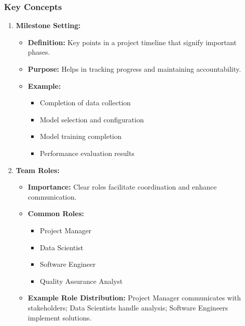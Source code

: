 \documentclass[aspectratio=169]{beamer}
\begin{document}
\begin{frame}[fragile]
    \frametitle{Key Concepts}
    \begin{enumerate}
        \item \textbf{Milestone Setting:}
            \begin{itemize}
                \item \textbf{Definition:} Key points in a project timeline that signify important phases.
                \item \textbf{Purpose:} Helps in tracking progress and maintaining accountability.
                \item \textbf{Example:}
                    \begin{itemize}
                        \item Completion of data collection
                        \item Model selection and configuration
                        \item Model training completion
                        \item Performance evaluation results
                    \end{itemize}
            \end{itemize}
        
        \item \textbf{Team Roles:}
            \begin{itemize}
                \item \textbf{Importance:} Clear roles facilitate coordination and enhance communication.
                \item \textbf{Common Roles:}
                    \begin{itemize}
                        \item Project Manager
                        \item Data Scientist
                        \item Software Engineer
                        \item Quality Assurance Analyst
                    \end{itemize}
                \item \textbf{Example Role Distribution:} Project Manager communicates with stakeholders; Data Scientists handle analysis; Software Engineers implement solutions.
            \end{itemize}
    \end{enumerate}
\end{frame}
\end{document}
